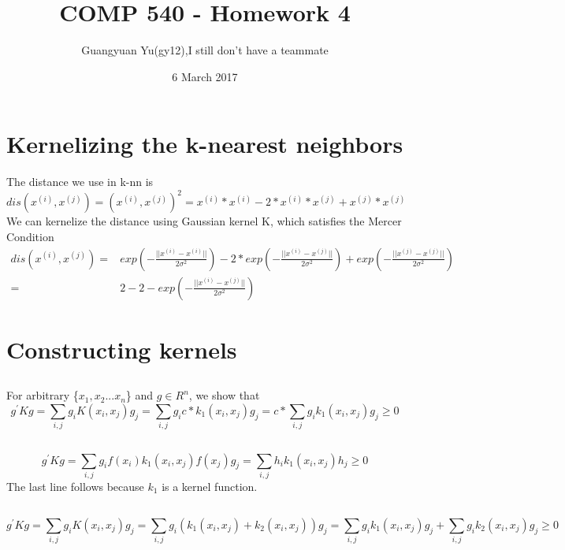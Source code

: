 \documentclass[pdftex,11pt]{article}
\title{COMP 540 - Homework 4}
\author{Guangyuan Yu(gy12),I still don't have a teammate}
\date{6 March 2017}
\begin{document}
\maketitle


\section{Kernelizing the k-nearest neighbors}
The distance we use in k-nn is
\begin{equation}
dis(x^{(i)},x^{(j)})=(x^{(i)},x^{(j)})^{2}=x^{(i)}*x^{(i)}-2*x^{(i)}*x^{(j)}+x^{(j)}*x^{(j)}
\end{equation}
We can kernelize the distance using Gaussian kernel K, which satisfies the Mercer Condition
\begin{equation}
\begin{split}
dis(x^{(i)},x^{(j)})=&exp(-\frac{||x^{(i)}-x^{(i)}||}{2\sigma^{2}})-2*exp(-\frac{||x^{(i)}-x^{(j)}||}{2\sigma^{2}})+exp(-\frac{||x^{(j)}-x^{(j)}||}{2\sigma^{2}})\\
=&2-2-exp(-\frac{||x^{(i)}-x^{(j)}||}{2\sigma^{2}})
\end{split}
\end{equation}
\section{Constructing kernels}
\subsection{}
For arbitrary \{$x_{1},x_{2}...x_{n}$\} and $g\in R^{n}$, we show that 
\begin{equation}
g^{'}Kg=\sum_{i,j}g_{i}K(x_{i},x_{j})g_{j}=\sum_{i,j}g_{i}c*k_{1}(x_{i},x_{j})g_{j}=c*\sum_{i,j}g_{i}k_{1}(x_{i},x_{j})g_{j}\geqslant0
\end{equation}
\subsection{}
\begin{equation}
g^{'}Kg=\sum_{i,j}g_{i}f(x_{i})k_{1}(x_{i},x_{j})f(x_{j})g_{j}=\sum_{i,j}h_{i}k_{1}(x_{i},x_{j})h_{j}\geqslant0
\end{equation}
The last line follows because $k_{1}$ is a kernel function.
\subsection{}
\begin{equation}
g^{'}Kg=\sum_{i,j}g_{i}K(x_{i},x_{j})g_{j}=\sum_{i,j}g_{i}(k_{1}(x_{i},x_{j})+k_{2}(x_{i},x_{j}))g_{j}=\sum_{i,j}g_{i}k_{1}(x_{i},x_{j})g_{j}+\sum_{i,j}g_{i}k_{2}(x_{i},x_{j})g_{j}\geqslant0
\end{equation}
\end{document}
